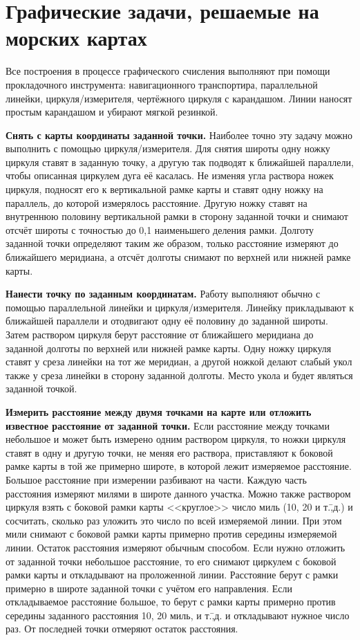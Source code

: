 \section{Графические задачи, решаемые на морских картах}

Все построения в процессе графического счисления выполняют при помощи
прокладочного инструмента: навигационного транспортира, параллельной
линейки, циркуля\-/измерителя, чертёжного циркуля с карандашом. Линии
наносят простым карандашом и убирают мягкой резинкой.

\textbf{Снять с карты координаты заданной точки.} Наиболее точно эту
задачу можно выполнить с помощью циркуля\-/измерителя. Для снятия
широты одну ножку циркуля ставят в заданную точку, а другую так
подводят к ближайшей параллели, чтобы описанная циркулем дуга её
касалась. Не изменяя угла раствора ножек циркуля, подносят его к
вертикальной рамке карты и ставят одну ножку на параллель, до которой
измерялось расстояние. Другую ножку ставят на внутреннюю половину
вертикальной рамки в сторону заданной точки и снимают отсчёт широты с
точностью до 0,1 наименьшего деления рамки. Долготу заданной точки
определяют таким же образом, только расстояние измеряют до ближайшего
меридиана, а отсчёт долготы снимают по верхней или нижней рамке карты.

\textbf{Нанести точку по заданным координатам.} Работу выполняют
обычно с помощью параллельной линейки и циркуля\-/измерителя. Линейку
прикладывают к ближайшей параллели и отодвигают одну её половину до
заданной широты. Затем раствором циркуля берут расстояние от
ближайшего меридиана до заданной долготы по верхней или нижней рамке
карты. Одну ножку циркуля ставят у среза линейки на тот же меридиан, а
другой ножкой делают слабый укол также у среза линейки в сторону
заданной долготы. Место укола и будет являться заданной точкой.

\textbf{Измерить расстояние между двумя точками на карте или отложить
  известное расстояние от заданной точки.} Если расстояние между
точками небольшое и может быть измерено одним раствором циркуля, то
ножки циркуля ставят в одну и другую точки, не меняя его раствора,
приставляют к боковой рамке карты в той же примерно широте, в которой
лежит измеряемое расстояние. Большое расстояние при измерении
разбивают на части. Каждую часть расстояния измеряют милями в широте
данного участка. Можно также раствором циркуля взять с боковой рамки
карты <<круглое>> число миль (10, 20 и т.\=,д.) и сосчитать, сколько
раз уложить это число по всей измеряемой линии. При этом мили снимают
с боковой рамки карты примерно против середины измеряемой
линии. Остаток расстояния измеряют обычным способом. Если нужно
отложить от заданной точки небольшое расстояние, то его снимают
циркулем с боковой рамки карты и откладывают на проложенной
линии. Расстояние берут с рамки примерно в широте заданной точки с
учётом его направления. Если откладываемое расстояние большое, то
берут с рамки карты примерно против середины заданного расстояния 10,
20 миль, и т.\=,д. и откладывают нужное число раз. От последней точки
отмеряют остаток расстояния.
 

